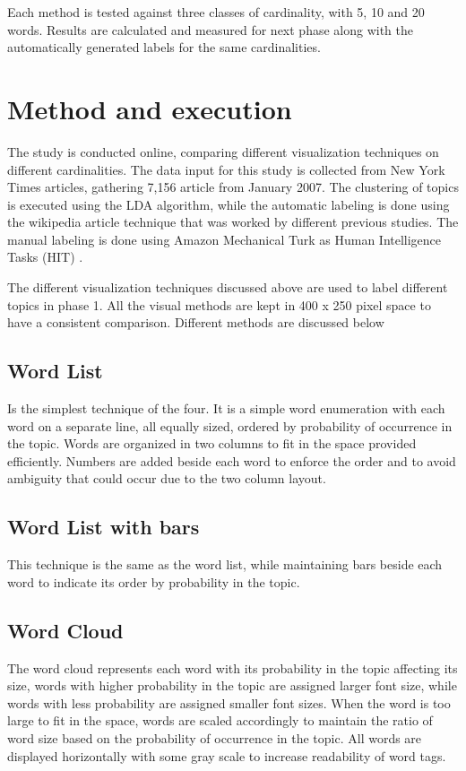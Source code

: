 \newParagraph
Each method is tested against three classes of cardinality, with 5, 10 and 20 words. Results are calculated and measured for next phase along with the automatically
generated labels for the same cardinalities.

\section{Method and execution}
\label{sec:method}

The study is conducted online, comparing different visualization techniques on different cardinalities. The data input for this study is collected from New
 York Times articles, gathering 7,156 article from January 2007. The clustering of topics is executed using the LDA algorithm, while the automatic labeling
 is done using the wikipedia article technique that was worked by different previous studies. The manual labeling is done using Amazon Mechanical Turk as  Human Intelligence Tasks (HIT)
 .

\newParagraph
The different visualization techniques discussed above are used to label different topics in phase 1. All the visual methods are kept in 400 x 250 pixel space
to have a consistent comparison. Different methods are discussed below

\subsection{Word List}
Is the simplest technique of the four. It is a simple word enumeration with each word on a separate line, all equally sized, ordered by probability of occurrence
in the topic. Words are organized in two columns to fit in the space provided efficiently. Numbers are added beside each word to enforce the order and to avoid
ambiguity that could occur due to the two column layout.

\subsection{Word List with bars}
This technique is the same as the word list, while maintaining bars beside each word to indicate its order by probability in the topic.

\subsection{Word Cloud}
The word cloud represents each word with its probability in the topic affecting its size, words with higher probability in the topic are assigned larger font
size, while words with less probability are assigned smaller font sizes. When the word is too large to fit in the space, words are scaled accordingly to maintain
the ratio of word size based on the probability of occurrence in the topic. All words are displayed horizontally with some gray scale to increase readability of
word tags.

